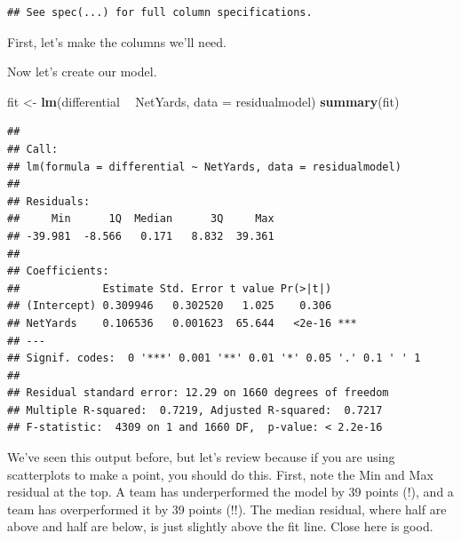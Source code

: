 \documentclass[
]{book}
\newenvironment{Shaded}{\begin{snugshade}}{\end{snugshade}}
\newcommand{\DataTypeTok}[1]{\textcolor[rgb]{0.13,0.29,0.53}{#1}}
\newcommand{\KeywordTok}[1]{\textcolor[rgb]{0.13,0.29,0.53}{\textbf{#1}}}
\newcommand{\NormalTok}[1]{#1}
\newcommand{\OperatorTok}[1]{\textcolor[rgb]{0.81,0.36,0.00}{\textbf{#1}}}
\newcommand{\StringTok}[1]{\textcolor[rgb]{0.31,0.60,0.02}{#1}}
\begin{document}
\begin{verbatim}
## See spec(...) for full column specifications.
\end{verbatim}

First, let's make the columns we'll need.

\begin{Shaded}
\end{Shaded}

Now let's create our model.

\begin{Shaded}
\begin{Highlighting}[]
\NormalTok{fit <-}\StringTok{ }\KeywordTok{lm}\NormalTok{(differential }\OperatorTok{~}\StringTok{ }\NormalTok{NetYards, }\DataTypeTok{data =}\NormalTok{ residualmodel)}
\KeywordTok{summary}\NormalTok{(fit)}
\end{Highlighting}
\end{Shaded}

\begin{verbatim}
## 
## Call:
## lm(formula = differential ~ NetYards, data = residualmodel)
## 
## Residuals:
##     Min      1Q  Median      3Q     Max 
## -39.981  -8.566   0.171   8.832  39.361 
## 
## Coefficients:
##             Estimate Std. Error t value Pr(>|t|)    
## (Intercept) 0.309946   0.302520   1.025    0.306    
## NetYards    0.106536   0.001623  65.644   <2e-16 ***
## ---
## Signif. codes:  0 '***' 0.001 '**' 0.01 '*' 0.05 '.' 0.1 ' ' 1
## 
## Residual standard error: 12.29 on 1660 degrees of freedom
## Multiple R-squared:  0.7219,	Adjusted R-squared:  0.7217 
## F-statistic:  4309 on 1 and 1660 DF,  p-value: < 2.2e-16
\end{verbatim}

We've seen this output before, but let's review because if you are using scatterplots to make a point, you should do this. First, note the Min and Max residual at the top. A team has underperformed the model by 39 points (!), and a team has overperformed it by 39 points (!!). The median residual, where half are above and half are below, is just slightly above the fit line. Close here is good.
\end{document}
